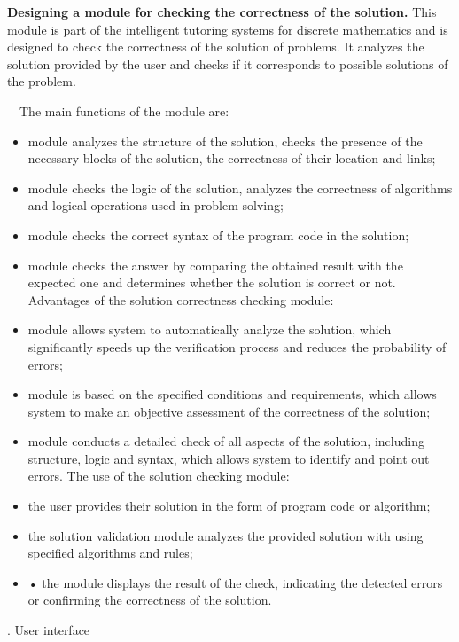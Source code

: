 \documentclass[a4paper]{article}
\newcommand{\RomanNumeralCaps}[1]
    {\MakeUppercase{\romannumeral #1}}
\begin{document}
\begin{multicols}{2}
\begin{justify}
\textbf{Designing a module for checking the correctness
of the solution.} This module is part of the intelligent
tutoring systems for discrete mathematics and is designed
to check the correctness of the solution of problems. It
analyzes the solution provided by the user and checks if
it corresponds to possible solutions of the problem.
\vspace{0.1cm}


~~The main functions of the module are:
\begin{itemize}
    \item module analyzes the structure of the solution,
checks the presence of the necessary blocks of the
solution, the correctness of their location and links;

    \item module checks the logic of the solution, analyzes
the correctness of algorithms and logical operations
used in problem solving;
    \item module checks the correct syntax of the program
code in the solution;
\item module checks the answer by comparing the obtained result with the expected one and determines
whether the solution is correct or not.
Advantages of the solution correctness checking module:
\item module allows system to automatically analyze the
solution, which significantly speeds up the verification process and reduces the probability of errors;

\item module is based on the specified conditions and
requirements, which allows system to make an objective assessment of the correctness of the solution;

\item module conducts a detailed check of all aspects of
the solution, including structure, logic and syntax,
which allows system to identify and point out errors.
The use of the solution checking module:
\item the user provides their solution in the form of
program code or algorithm;
\item the solution validation module analyzes the provided
solution with using specified algorithms and rules;
\item• the module displays the result of the check, indicating the detected errors or confirming the correctness
of the solution.
\end{itemize}
\vspace{0.3cm}
\begin{center}
    \RomanNumeralCaps{5.}  User interface
\end{center}


\end{justify}
\end{multicols}
\end{document}
